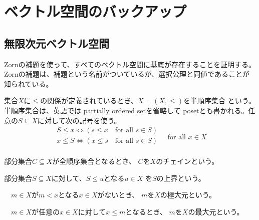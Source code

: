 \begingroup %
	\newcommand{\Hom}{\myop{Hom}}
	\newcommand{\End}{\myop{End}}
	\newcommand{\Auto}{\myop{Auto}}
	\newcommand{\Pow}{\mycal{P}}
	\newcommand{\Word}{\mycal{W}}
	\newcommand{\Forget}{\mycal{U}}
	\newcommand{\id}{\myop{id}}
	\newcommand{\dup}{\myop{du}}
	\newcommand{\onto}{\myop{onto}}
	\newcommand{\im}{\myop{im}}
	\newcommand{\spanall}{\myop{span}}
	\newcommand{\rank}{\myop{rank}}
	\newcommand{\ofm}{only finitely many }
	\newcommand{\bunsub}{{\mybf{P}}}
	\newcommand{\q}[1]{\pi_\sizen{#1}^{-1}}

\section{ベクトル空間のバックアップ}\label{s1:ベクトル空間のバックアップ} %
\subsection{無限次元ベクトル空間}\label{s2:無限次元ベクトル空間} %
	Zornの補題を使って、すべてのベクトル空間に基底が存在することを証明する。
	Zornの補題は、補題という名前がついているが、選択公理と同値であることが
	知られている。

	\begin{definition}[半順序集合]\label{def:半順序集合} %
		集合$X$に$\le$の関係が定義されているとき、$X=(X,\le)$を半順序集合
		という。半順序集合は、英語では
		\underline{p}artially \underline{o}rdered \underline{set}を省略して
		posetとも書かれる。任意の$S\subseteq X$に対して次の記号を使う。
		\begin{equation*}\begin{split}
			S\le x \iff (s\le x \quad\text{for all }s\in S) \\
			x\le S \iff (x\le s \quad\text{for all }s\in S) \\
		\end{split}
			\quad\text{for all }x\in X
		\end{equation*}
		\begin{description}\setlength{\itemsep}{-1mm} %
			\item[チェイン] 部分集合$C\subseteq X$が全順序集合となるとき、
			$C$を$X$のチェインという。
			\item[上界] 部分集合$S\subseteq X$に対して、$S\le u$となる$u\in X$
			を$S$の上界という。
			\item[極大元]　$m\in X$が$m<x$となる$x\in X$がないとき、
			$m$を$X$の極大元という。
			\item[最大元]　$m\in X$が任意の$x\in X$に対して$x\le m$となるとき、
			$m$を$X$の最大元という。
		\end{description} %
	\end{definition} %

